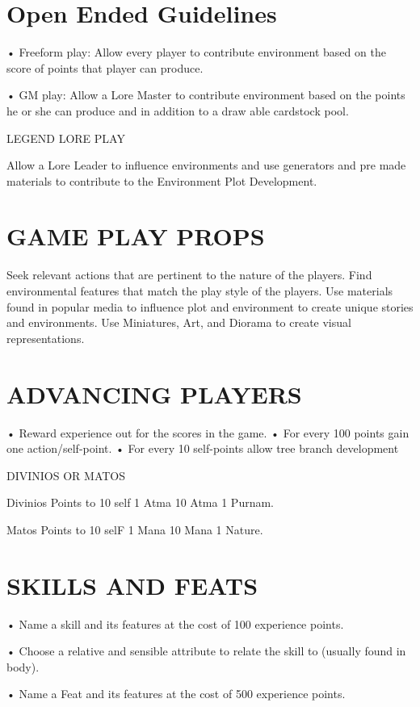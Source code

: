 \documentclass{article}
\begin{document}
\section{Open Ended Guidelines}

• Freeform play:
Allow every player to contribute environment based on the score of points that player can
produce.

• GM play:
Allow a Lore Master to contribute environment based on the points he or she can produce and in
addition to a draw able cardstock pool.

LEGEND LORE PLAY

Allow a Lore Leader to influence environments and use generators and pre made materials to
contribute to the Environment Plot Development.

\section{GAME PLAY PROPS}

Seek relevant actions that are pertinent to the nature of the players. Find environmental features
that match the play style of the players. Use materials found in popular media to influence plot
and environment to create unique stories and environments. Use Miniatures, Art, and Diorama to
create visual representations.

\section{ADVANCING PLAYERS}

• Reward experience out for the scores in the game.
• For every 100 points gain one action/self-point.
• For every 10 self-points allow tree branch development

DIVINIOS OR MATOS

Divinios Points to 10 self 1 Atma 10 Atma 1 Purnam.

Matos Points to 10 selF 1 Mana 10 Mana 1 Nature.

\section{SKILLS AND FEATS}

• Name a skill and its features at the cost of 100 experience points.

• Choose a relative and sensible attribute to relate the skill to (usually found in body).

• Name a Feat and its features at the cost of 500 experience points.
\end{document}
